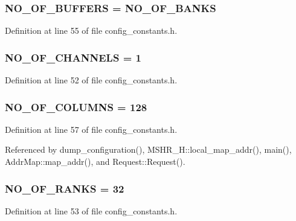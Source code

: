 \subsubsection[{NO\_\-OF\_\-BUFFERS}]{ {\bf NO\_\-OF\_\-BUFFERS} = {\bf NO\_\-OF\_\-BANKS}}\label{config__constants_8h_9a3d0e2a191845b6b14b2c7a1faab4c2}




Definition at line 55 of file config\_\-constants.h.
\subsubsection[{NO\_\-OF\_\-CHANNELS}]{ {\bf NO\_\-OF\_\-CHANNELS} = 1}\label{config__constants_8h_9ae97152d782bf89a47f2fb62982bd91}




Definition at line 52 of file config\_\-constants.h.
\subsubsection[{NO\_\-OF\_\-COLUMNS}]{ {\bf NO\_\-OF\_\-COLUMNS} = 128}\label{config__constants_8h_ffc6bbc04b2973cf564f70f37103a946}




Definition at line 57 of file config\_\-constants.h.

Referenced by dump\_\-configuration(), MSHR\_\-H::local\_\-map\_\-addr(), main(), AddrMap::map\_\-addr(), and Request::Request().
\subsubsection[{NO\_\-OF\_\-RANKS}]{ {\bf NO\_\-OF\_\-RANKS} = 32}\label{config__constants_8h_e1acef1609deca0291eaf30593109d17}




Definition at line 53 of file config\_\-constants.h.


